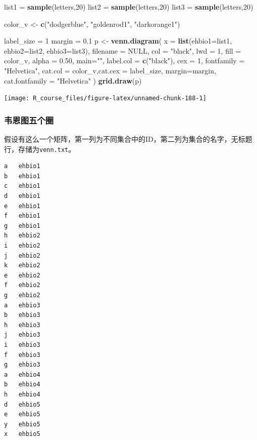\documentclass[]{article}
\newenvironment{Shaded}{\begin{snugshade}}{\end{snugshade}}
\newcommand{\KeywordTok}[1]{\textcolor[rgb]{0.13,0.29,0.53}{\textbf{{#1}}}}
\newcommand{\DataTypeTok}[1]{\textcolor[rgb]{0.13,0.29,0.53}{{#1}}}
\newcommand{\DecValTok}[1]{\textcolor[rgb]{0.00,0.00,0.81}{{#1}}}
\newcommand{\FloatTok}[1]{\textcolor[rgb]{0.00,0.00,0.81}{{#1}}}
\newcommand{\StringTok}[1]{\textcolor[rgb]{0.31,0.60,0.02}{{#1}}}
\newcommand{\OtherTok}[1]{\textcolor[rgb]{0.56,0.35,0.01}{{#1}}}
\newcommand{\NormalTok}[1]{{#1}}
\numberwithin{figure}{section}
\numberwithin{table}{section}
\theoremstyle{definition}
\theoremstyle{definition}
\theoremstyle{definition}
\theoremstyle{remark}
\begin{document}
\begin{Shaded}
\begin{Highlighting}[]
\NormalTok{list1 =}\StringTok{ }\KeywordTok{sample}\NormalTok{(letters,}\DecValTok{20}\NormalTok{)}
\NormalTok{list2 =}\StringTok{ }\KeywordTok{sample}\NormalTok{(letters,}\DecValTok{20}\NormalTok{)}
\NormalTok{list3 =}\StringTok{ }\KeywordTok{sample}\NormalTok{(letters,}\DecValTok{20}\NormalTok{)}

\NormalTok{color_v <-}\StringTok{ }\KeywordTok{c}\NormalTok{(}\StringTok{"dodgerblue"}\NormalTok{, }\StringTok{"goldenrod1"}\NormalTok{, }\StringTok{"darkorange1"}\NormalTok{)}


\NormalTok{label_size =}\StringTok{ }\DecValTok{1}
\NormalTok{margin =}\StringTok{ }\FloatTok{0.1}
\NormalTok{p <-}\StringTok{ }\KeywordTok{venn.diagram}\NormalTok{( }
    \DataTypeTok{x =} \KeywordTok{list}\NormalTok{(}\DataTypeTok{ehbio1=}\NormalTok{list1, }\DataTypeTok{ehbio2=}\NormalTok{list2, }\DataTypeTok{ehbio3=}\NormalTok{list3),}
    \DataTypeTok{filename =} \OtherTok{NULL}\NormalTok{, }\DataTypeTok{col =} \StringTok{"black"}\NormalTok{, }\DataTypeTok{lwd =} \DecValTok{1}\NormalTok{, }
    \DataTypeTok{fill =} \NormalTok{color_v, }\DataTypeTok{alpha =} \FloatTok{0.50}\NormalTok{, }\DataTypeTok{main=}\StringTok{""}\NormalTok{, }
    \DataTypeTok{label.col =} \KeywordTok{c}\NormalTok{(}\StringTok{"black"}\NormalTok{), }\DataTypeTok{cex =} \DecValTok{1}\NormalTok{, }\DataTypeTok{fontfamily =} \StringTok{"Helvetica"}\NormalTok{,}
    \DataTypeTok{cat.col =} \NormalTok{color_v,}\DataTypeTok{cat.cex =} \NormalTok{label_size, }
    \DataTypeTok{margin=}\NormalTok{margin, }
    \DataTypeTok{cat.fontfamily =} \StringTok{"Helvetica"}
\NormalTok{)}
\KeywordTok{grid.draw}\NormalTok{(p)}
\end{Highlighting}
\end{Shaded}

\begin{center}\texttt{[image: R\_course\_files/figure-latex/unnamed-chunk-188-1]} \end{center}

\subsubsection{韦恩图五个圈}

假设有这么一个矩阵，第一列为不同集合中的ID，第二列为集合的名字，无标题行，存储为\texttt{venn.txt}。

\begin{verbatim}
a   ehbio1
b   ehbio1
c   ehbio1
d   ehbio1
e   ehbio1
f   ehbio1
g   ehbio1
h   ehbio2
i   ehbio2
j   ehbio2
k   ehbio2
e   ehbio2
f   ehbio2
g   ehbio2
a   ehbio3
b   ehbio3
h   ehbio3
j   ehbio3
i   ehbio3
f   ehbio3
g   ehbio3
a   ehbio4
b   ehbio4
h   ehbio4
d   ehbio5
e   ehbio5
y   ehbio5
x   ehbio5
\end{verbatim}
\end{document}
